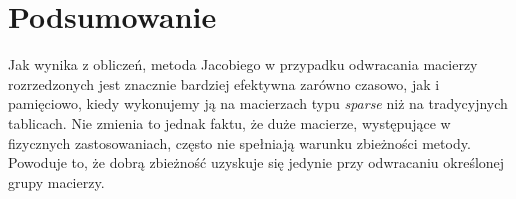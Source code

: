 \documentclass[a4paper,margin=1.54cm]{article}
\begin{document}
\section{Podsumowanie}
Jak wynika z obliczeń, metoda Jacobiego w przypadku odwracania macierzy rozrzedzonych jest znacznie bardziej efektywna zarówno czasowo, jak i pamięciowo, kiedy wykonujemy ją na macierzach typu \textit{sparse} niż na tradycyjnych tablicach. Nie zmienia to jednak faktu, że duże macierze, występujące w fizycznych zastosowaniach, często nie spełniają warunku zbieżności metody. Powoduje to, że dobrą zbieżność uzyskuje się jedynie przy odwracaniu określonej grupy macierzy. 



\end{document}
